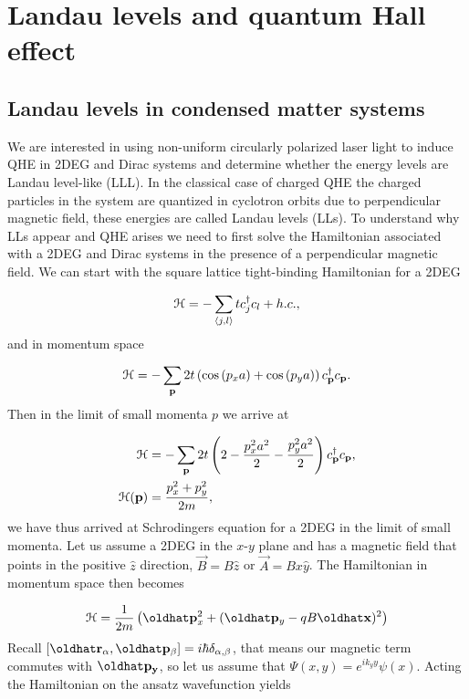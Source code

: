\section{Landau levels and quantum Hall effect}

\subsection{Landau levels in condensed matter systems}
We are interested in using non-uniform circularly polarized laser light to induce QHE in 2DEG and Dirac systems and determine whether the energy levels are Landau level-like (LLL).
In the classical case of charged QHE the charged particles in the system are quantized in cyclotron orbits due to perpendicular magnetic field, these energies are called Landau levels (LLs).
To understand why LLs appear and QHE arises we need to first solve the Hamiltonian associated with a 2DEG and Dirac systems in the presence of a perpendicular magnetic field.
We can start with the square lattice tight-binding Hamiltonian for a 2DEG

\begin{equation}
  \mathcal{H} = -\sum_{\langle j,l \rangle} tc^{\dagger}_j c_{l} + h.c.,
\end{equation}
and in momentum space

\begin{equation}
  \mathcal{H} = -\sum_{\mathbf{p}} 2t \left( \cos{(p_x a)} + \cos{(p_y a)} \right) c^{\dagger}_{\mathbf{p}} c_{\mathbf{p}}.
\end{equation}
Then in the limit of small momenta $p$ we arrive at

\begin{align}
  \mathcal{H} &= -\sum_{\mathbf{p}} 2t \left( 2 - \dfrac{p_x^2a^2}{2} -\dfrac{p_y^2a^2}{2} \right) c^{\dagger}_{\mathbf{p}} c_{\mathbf{p}}, \nonumber \\
  \mathcal{H}(\mathbf{p}) &= \dfrac{p_x^2 + p_y^2}{2m},
\end{align}
we have thus arrived at Schrodingers equation for a 2DEG in the limit of small momenta.
Let us assume a 2DEG in the $x$-$y$ plane and has a magnetic field that points in the positive $\hat{z}$ direction, $\vec{B} = B\hat{z}$ or $\vec{A} = Bx\hat{y}$.
The Hamiltonian in momentum space then becomes

\begin{equation}
  \ham = \dfrac{1}{2m} \left( \op{p}_x^2 + (\op{p}_y - qB \op{x})^2 \right)
\end{equation}
Recall $[\op{r}_{\alpha}, \op{p}_{\beta}] = i\hbar \delta_{\alpha,\beta}$, that means our magnetic term commutes with $\op{p_y}$, so let us assume that $\Psi(x,y) = e^{ik_y y} \psi(x)$.
Acting the Hamiltonian on the ansatz wavefunction yields

